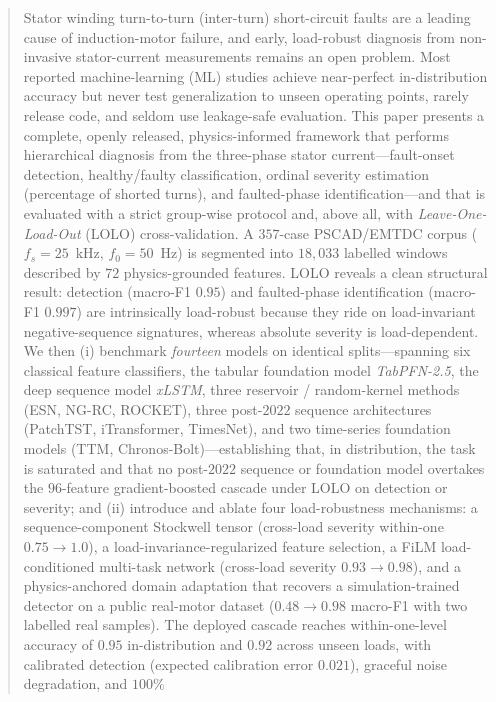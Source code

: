 \documentclass[journal]{IEEEtran}
\begin{document}
\begin{abstract}
Stator winding turn-to-turn (inter-turn) short-circuit faults are a leading cause of
induction-motor failure, and early, load-robust diagnosis from non-invasive stator-current
measurements remains an open problem. Most reported machine-learning (ML) studies achieve
near-perfect in-distribution accuracy but never test generalization to unseen operating points,
rarely release code, and seldom use leakage-safe evaluation. This paper presents a complete,
openly released, physics-informed framework that performs hierarchical diagnosis from the
three-phase stator current---fault-onset detection, healthy/faulty classification, ordinal severity
estimation (percentage of shorted turns), and faulted-phase identification---and that is evaluated
with a strict group-wise protocol and, above all, with \emph{Leave-One-Load-Out} (LOLO)
cross-validation. A $357$-case PSCAD/EMTDC corpus ($f_s=25$~kHz, $f_0=50$~Hz) is segmented into
$18{,}033$ labelled windows described by $72$ physics-grounded features. LOLO reveals a clean
structural result: detection (macro-F1 $0.95$) and faulted-phase identification (macro-F1 $0.997$)
are intrinsically load-robust because they ride on load-invariant negative-sequence signatures,
whereas absolute severity is load-dependent. We then (i) benchmark \emph{fourteen} models on
identical splits---spanning six classical feature classifiers, the tabular foundation model
\emph{TabPFN-2.5}, the deep sequence model \emph{xLSTM}, three reservoir / random-kernel
methods (ESN, NG-RC, ROCKET), three post-$2022$ sequence architectures (PatchTST, iTransformer,
TimesNet), and two time-series foundation models (TTM, Chronos-Bolt)---establishing that, in
distribution, the task is saturated and that no post-$2022$ sequence or foundation model
overtakes the $96$-feature gradient-boosted cascade under LOLO on detection or severity; and (ii) introduce and
ablate four load-robustness mechanisms: a sequence-component Stockwell tensor (cross-load severity
within-one $0.75\!\rightarrow\!1.0$), a load-invariance-regularized feature selection, a
FiLM load-conditioned multi-task network (cross-load severity $0.93\!\rightarrow\!0.98$), and a
physics-anchored domain adaptation that recovers a simulation-trained detector on a public real-motor
dataset ($0.48\!\rightarrow\!0.98$ macro-F1 with two labelled real samples). The deployed cascade
reaches within-one-level accuracy of $0.95$ in-distribution and $0.92$ across unseen loads, with
calibrated detection (expected calibration error $0.021$), graceful noise degradation, and $100\%$

\end{abstract}
\end{document}
